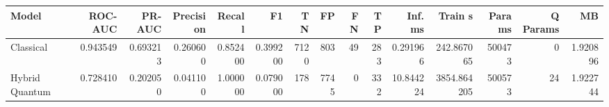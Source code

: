 \begin{table}[ht]
\centering
\begin{tabular}{lrrrrrrrrrrrrrr}
\toprule
Model & ROC-AUC & PR-AUC & Precision & Recall & F1 & TN & FP & FN & TP & Inf. ms & Train s & Params & Q Params & MB \\
\midrule
Classical & 0.943549 & 0.693213 & 0.260600 & 0.852400 & 0.399200 & 7120 & 803 & 49 & 283 & 0.291966 & 242.867065 & 500473 & 0 & 1.920896 \\
Hybrid Quantum & 0.728410 & 0.202050 & 0.041100 & 1.000000 & 0.079000 & 178 & 7745 & 0 & 332 & 10.844224 & 3854.864205 & 500573 & 24 & 1.922744 \\
\bottomrule
\end{tabular}
\end{table}

